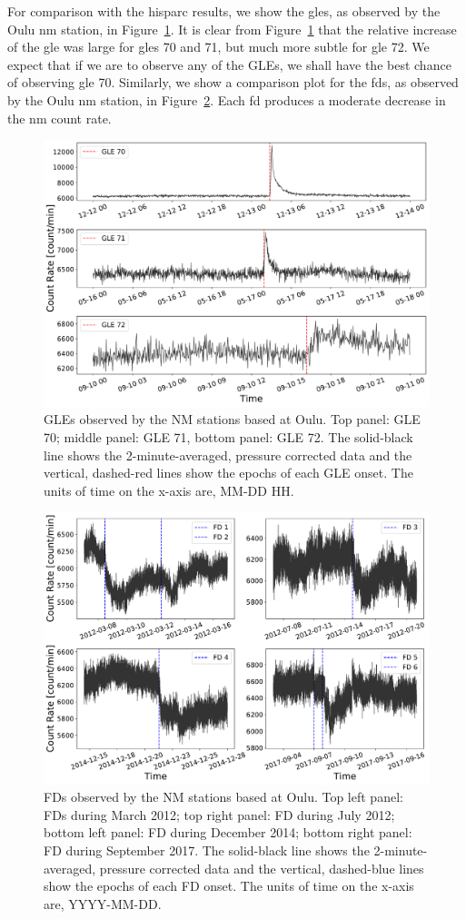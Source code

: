 For comparison with the \gls{hisparc} results, we show the \glspl{gle}, as observed by the Oulu \gls{nm} station, in Figure~\ref{fig:oulu_gles}. It is clear from Figure~\ref{fig:oulu_gles} that the relative increase of the \gls{gle} was large for \glspl{gle} 70 and 71, but much more subtle for \gls{gle} 72. We expect that if we are to observe any of the GLEs, we shall have the best chance of observing \gls{gle} 70. Similarly, we show a comparison plot for the \glspl{fd}, as observed by the Oulu \gls{nm} station, in Figure~\ref{fig:oulu_fds}. Each \gls{fd} produces a moderate decrease in the \gls{nm} count rate.

\begin{figure}[ht!]
	\centering
	\includegraphics[width=0.75\columnwidth]{GLEs_OULU.pdf}
	\caption{GLEs observed by the NM stations based at Oulu. Top panel: GLE 70; middle panel: GLE 71, bottom panel: GLE 72. The solid-black line shows the 2-minute-averaged, pressure corrected data and the vertical, dashed-red lines show the epochs of each GLE onset. The units of time on the x-axis are, MM-DD HH.}
	\label{fig:oulu_gles}
\end{figure}


\begin{figure}[ht!]
	\centering
	\includegraphics[width=0.75\columnwidth]{FDs_OULU.pdf}
	\caption{FDs observed by the NM stations based at Oulu. Top left panel: FDs during March 2012; top right panel: FD during July 2012; bottom left panel: FD during December 2014; bottom right panel: FD during September 2017. The solid-black line shows the 2-minute-averaged, pressure corrected data and the vertical, dashed-blue lines show the epochs of each FD onset. The units of time on the x-axis are, YYYY-MM-DD.}
	\label{fig:oulu_fds}
\end{figure}







